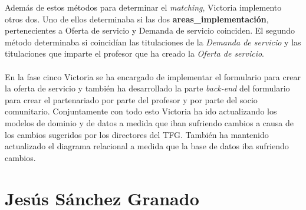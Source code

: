 \documentclass[11pt]{book}
\begin{document}
	Además de estos métodos para determinar el \textit{matching}, Victoria implemento otros dos. Uno de ellos determinaba si las dos \textbf{areas\_implementación}, pertenecientes a Oferta de servicio y Demanda de servicio coinciden. El segundo método determinaba si coincidían las titulaciones de la \textit{Demanda de servicio} y las titulaciones que imparte el profesor que ha creado la \textit{Oferta de servicio}.\\\\
	En la fase cinco Victoria se ha encargado de implementar el formulario para crear la oferta de servicio y también ha desarrollado la parte \textit{back-end} del formulario para crear el partenariado por parte del profesor y por parte del socio comunitario.
	Conjuntamente con todo esto Victoria ha ido actualizando los modelos de dominio y de datos a medida que iban sufriendo cambios a causa de los cambios sugeridos por los directores del TFG. También ha mantenido actualizado el diagrama relacional a medida que la base de datos iba sufriendo cambios.
	\section{Jesús Sánchez Granado}
	
\end{document}
